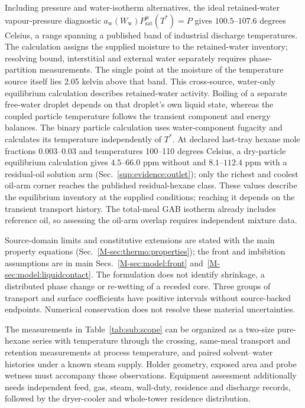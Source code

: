 \documentclass[11pt]{article}
\begin{document}
Including pressure and water-isotherm alternatives, the ideal retained-water vapour-pressure diagnostic $a_{\mathrm w}(W_{\mathrm w})P_{\mathrm{sat}}^{\mathrm w}(T^*)=P$ gives $100.5$--$107.6$ degrees Celsius, a range spanning a published band of industrial discharge temperatures. The calculation assigns the supplied moisture to the retained-water inventory; resolving bound, interstitial and external water separately requires phase-partition measurements. The single point at the moisture of the temperature source itself lies 2.05 kelvin above that band. This cross-source, water-only equilibrium calculation describes retained-water activity. Boiling of a separate free-water droplet depends on that droplet's own liquid state, whereas the coupled particle temperature follows the transient component and energy balances. The binary particle calculation uses water-component fugacity and calculates its temperature independently of $T^*$. At declared last-tray hexane mole fractions $0.003$--$0.03$ and temperatures 100--110 degrees Celsius, a dry-particle equilibrium calculation gives $4.5$--$66.0$ ppm without and $8.1$--$112.4$ ppm with a residual-oil solution arm (Sec.~\ref{sup:evidence:outlet}); only the richest and coolest oil-arm corner reaches the published residual-hexane class. These values describe the equilibrium inventory at the supplied conditions; reaching it depends on the transient transport history. The total-meal GAB isotherm already includes reference oil, so assessing the oil-arm overlap requires independent mixture data.

Source-domain limits and constitutive extensions are stated with the main
property equations (Sec.~\ref*{M-sec:thermo:properties}); the front and
imbibition assumptions are in main Secs.~\ref*{M-sec:model:front}
and~\ref*{M-sec:model:liquidcontact}. The formulation does not identify
shrinkage, a distributed phase change or re-wetting of a receded core.
Three groups of transport and surface coefficients have positive intervals
without source-backed endpoints. Numerical conservation does not resolve
these material uncertainties.

The measurements in Table~\ref{tab:sub:scope} can be organized as a
two-size pure-hexane series with temperature through the crossing,
same-meal transport and retention measurements at process temperature,
and paired solvent--water histories under a known steam supply. Holder
geometry, exposed area and probe wetness must accompany those observations.
Equipment assessment additionally needs independent feed, gas, steam,
wall-duty, residence and discharge records, followed by the dryer-cooler
and whole-tower residence distribution.
\end{document}
